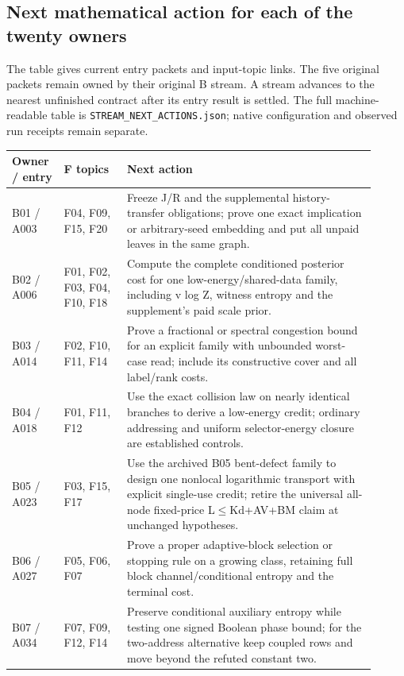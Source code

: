 \documentclass[11pt]{article}
\begin{document}
\subsection{Next mathematical action for each of the twenty owners}

The table gives current entry packets and input-topic links. The five original packets remain owned by their original B stream. A stream advances to the nearest unfinished contract after its entry result is settled. The full machine-readable table is \texttt{STREAM\_NEXT\_ACTIONS.json}; native configuration and observed run receipts remain separate.

\begingroup\small
\begin{longtable}{>{\raggedright\arraybackslash}p{0.12\linewidth}>{\raggedright\arraybackslash}p{0.16\linewidth}>{\raggedright\arraybackslash}p{0.63\linewidth}}
\toprule
Owner / entry & F topics & Next action \\
\midrule\endhead
B01 / A003 & F04, F09, F15, F20 & Freeze J/R and the supplemental history-transfer obligations; prove one exact implication or arbitrary-seed embedding and put all unpaid leaves in the same graph. \\
B02 / A006 & F01, F02, F03, F04, F10, F18 & Compute the complete conditioned posterior cost for one low-energy/shared-data family, including v log Z, witness entropy and the supplement's paid scale prior. \\
B03 / A014 & F02, F10, F11, F14 & Prove a fractional or spectral congestion bound for an explicit family with unbounded worst-case read; include its constructive cover and all label/rank costs. \\
B04 / A018 & F01, F11, F12 & Use the exact collision law on nearly identical branches to derive a low-energy credit; ordinary addressing and uniform selector-energy closure are established controls. \\
B05 / A023 & F03, F15, F17 & Use the archived B05 bent-defect family to design one nonlocal logarithmic transport with explicit single-use credit; retire the universal all-node fixed-price L$\le$Kd+AV+BM claim at unchanged hypotheses. \\
B06 / A027 & F05, F06, F07 & Prove a proper adaptive-block selection or stopping rule on a growing class, retaining full block channel/conditional entropy and the terminal cost. \\
B07 / A034 & F07, F09, F12, F14 & Preserve conditional auxiliary entropy while testing one signed Boolean phase bound; for the two-address alternative keep coupled rows and move beyond the refuted constant two. \\

\end{longtable}
\end{document}
